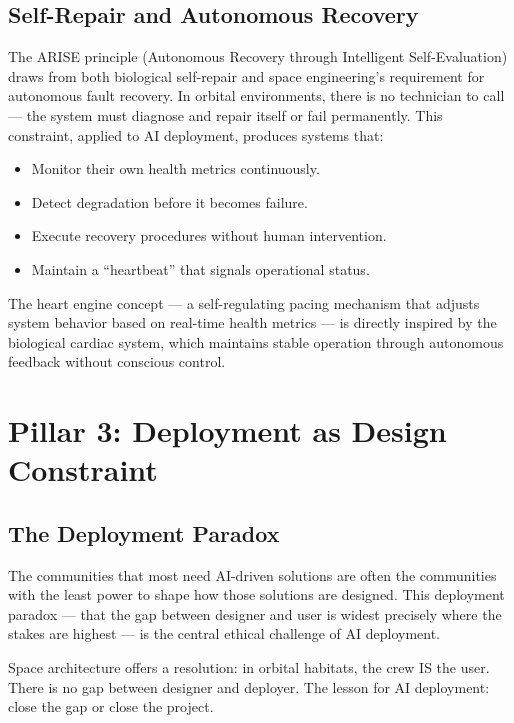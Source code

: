 \documentclass[11pt,a4paper]{article}
\begin{document}
\subsection{Self-Repair and Autonomous Recovery}

The ARISE principle (Autonomous Recovery through Intelligent Self-Evaluation) draws from both biological self-repair and space engineering's requirement for autonomous fault recovery. In orbital environments, there is no technician to call --- the system must diagnose and repair itself or fail permanently. This constraint, applied to AI deployment, produces systems that:

\begin{itemize}[leftmargin=*, itemsep=2pt]
  \item Monitor their own health metrics continuously.
  \item Detect degradation before it becomes failure.
  \item Execute recovery procedures without human intervention.
  \item Maintain a ``heartbeat'' that signals operational status.
\end{itemize}

The heart engine concept --- a self-regulating pacing mechanism that adjusts system behavior based on real-time health metrics --- is directly inspired by the biological cardiac system, which maintains stable operation through autonomous feedback without conscious control.

\section{Pillar 3: Deployment as Design Constraint}

\subsection{The Deployment Paradox}

The communities that most need AI-driven solutions are often the communities with the least power to shape how those solutions are designed. This deployment paradox --- that the gap between designer and user is widest precisely where the stakes are highest --- is the central ethical challenge of AI deployment.

Space architecture offers a resolution: in orbital habitats, the crew IS the user. There is no gap between designer and deployer. The lesson for AI deployment: close the gap or close the project.
\end{document}
